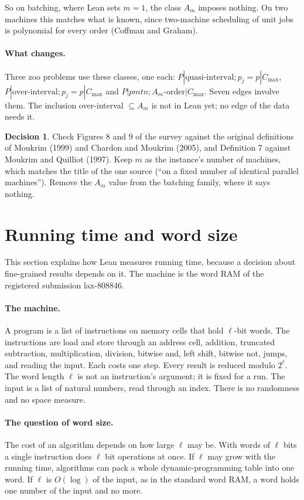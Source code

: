 \documentclass[11pt]{article}
\newcommand{\Cmax}{C_{\max}}
\theoremstyle{definition}
\newtheorem{decision}{Decision}
\begin{document}
So on batching, where Lean sets $m=1$, the class $A_m$ imposes nothing. On
two machines this matches what is known, since two-machine scheduling of unit
jobs is polynomial for every order (Coffman and Graham).

\paragraph{What changes.} Three zoo problems use these classes, one each:
$P|\text{quasi-interval};p_j=p|\Cmax$, $P|\text{over-interval};p_j=p|\Cmax$ and
$P|pmtn;A_m\text{-order}|\Cmax$. Seven edges involve them. The inclusion
over-interval $\subseteq A_m$ is not in Lean yet; no edge of the data needs it.

\begin{decision}
Check Figures 8 and 9 of the survey against the original definitions of
Moukrim (1999) and Chardon and Moukrim (2005), and Definition 7 against
Moukrim and Quilliot (1997). Keep $m$ as the instance's number of machines,
which matches the title of the one source (``on a fixed number of identical
parallel machines''). Remove the $A_m$ value from the batching family, where it
says nothing.
\end{decision}

\section{Running time and word size}\label{sec:words}

This section explains how Lean measures running time, because a decision about
fine-grained results depends on it. The machine is the word RAM of the
registered submission lax-808846.

\paragraph{The machine.} A program is a list of instructions on
memory cells that hold $\ell$-bit words. The instructions are load and store
through an address cell, addition, truncated subtraction, multiplication,
division, bitwise and, left shift, bitwise not, jumps, and reading the input.
Each costs one step. Every result is reduced modulo $2^\ell$. The word length
$\ell$ is not an instruction's argument; it is fixed for a run. The input is a
list of natural numbers, read through an index. There is no randomness and no
space measure.

\paragraph{The question of word size.} The cost of an algorithm depends on
how large $\ell$ may be. With words of $\ell$ bits a single instruction does
$\ell$ bit operations at once. If $\ell$ may grow with the running time,
algorithms can pack a whole dynamic-programming table into one word. If $\ell$ is
$O(\log)$ of the input, as in the standard word RAM, a word holds one number of
the input and no more.
\end{document}
